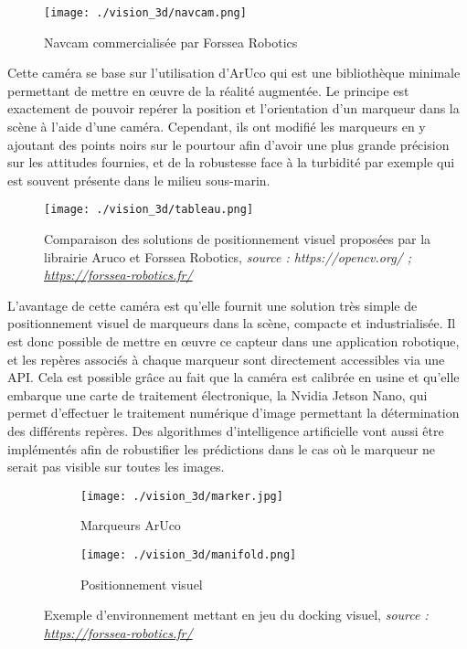     \begin{figure}[!htb]
        \centering
        \texttt{[image: ./vision\_3d/navcam.png]}
        \caption{Navcam commercialisée par Forssea Robotics}
        \label{fig:navcam}
    \end{figure}

    Cette caméra se base sur l’utilisation d’ArUco qui est une bibliothèque minimale permettant de mettre en œuvre de la réalité augmentée. Le principe est exactement de pouvoir repérer la position et l’orientation d’un marqueur dans la scène à l’aide d’une caméra. Cependant, ils ont modifié les marqueurs en y ajoutant des points noirs sur le pourtour afin d’avoir une plus grande précision sur les attitudes fournies, et de la robustesse face à la turbidité par exemple qui est souvent présente dans le milieu sous-marin.

    \begin{figure}[!htb]
        \centering
        \texttt{[image: ./vision\_3d/tableau.png]}
        \caption{Comparaison des solutions de positionnement visuel proposées par la librairie Aruco et Forssea Robotics, \textit{source : \textit{https://opencv.org/} ; \url{https://forssea-robotics.fr/}}}
        \label{fig:tableau}
    \end{figure}

    L’avantage de cette caméra est qu’elle fournit une solution très simple de positionnement visuel de marqueurs dans la scène, compacte et industrialisée. Il est donc possible de mettre en œuvre ce capteur dans une application robotique, et les repères associés à chaque marqueur sont directement accessibles via une API. Cela est possible grâce au fait que la caméra est calibrée en usine et qu’elle embarque une carte de traitement électronique, la Nvidia Jetson Nano, qui permet d’effectuer le traitement numérique d’image permettant la détermination des différents repères. Des algorithmes d’intelligence artificielle vont aussi être implémentés afin de robustifier les prédictions dans le cas où le marqueur ne serait pas visible sur toutes les images.

    \begin{figure}[!htb]
        \centering
        \begin{subfigure}[b]{0.3\textwidth}
            \centering
            \texttt{[image: ./vision\_3d/marker.jpg]}
            \caption{Marqueurs ArUco}
            \label{fig:marker}
        \end{subfigure}
        \hfill
        \begin{subfigure}[b]{0.6\textwidth}
            \centering
            \texttt{[image: ./vision\_3d/manifold.png]}
            \caption{Positionnement visuel}
            \label{fig:manifold}
        \end{subfigure}
        \caption{Exemple d'environnement mettant en jeu du docking visuel, \textit{source : \url{https://forssea-robotics.fr/}}}
        \label{fig:environnement}
    \end{figure}

